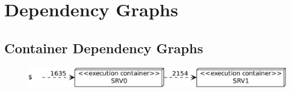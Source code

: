 \begin{figure}[h]\centering
{}
\end{figure}


\section{Dependency Graphs}

\subsection{Container Dependency Graphs}

\begin{figure}[h]\centering
\includegraphics[scale=0.4]{images/example-plots/containerDependencyGraph-crop} 
\end{figure}

